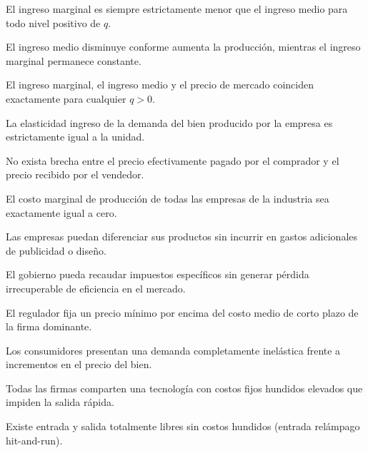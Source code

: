 \begin{opts}
    \item El ingreso marginal es siempre estrictamente menor que el ingreso medio para todo nivel positivo de $q$.
    \item El ingreso medio disminuye conforme aumenta la producción, mientras el ingreso marginal permanece constante.
    \item El ingreso marginal, el ingreso medio y el precio de mercado coinciden exactamente para cualquier $q > 0$.
    \item La elasticidad ingreso de la demanda del bien producido por la empresa es estrictamente igual a la unidad.
\end{opts}

\begin{opts}
    \item No exista brecha entre el precio efectivamente pagado por el comprador y el precio recibido por el vendedor.
    \item El costo marginal de producción de todas las empresas de la industria sea exactamente igual a cero.
    \item Las empresas puedan diferenciar sus productos sin incurrir en gastos adicionales de publicidad o diseño.
    \item El gobierno pueda recaudar impuestos específicos sin generar pérdida irrecuperable de eficiencia en el mercado.
\end{opts}

\begin{opts}
    \item El regulador fija un precio mínimo por encima del costo medio de corto plazo de la firma dominante.
    \item Los consumidores presentan una demanda completamente inelástica frente a incrementos en el precio del bien.
    \item Todas las firmas comparten una tecnología con costos fijos hundidos elevados que impiden la salida rápida.
    \item Existe entrada y salida totalmente libres sin costos hundidos (entrada relámpago hit-and-run).
\end{opts}

